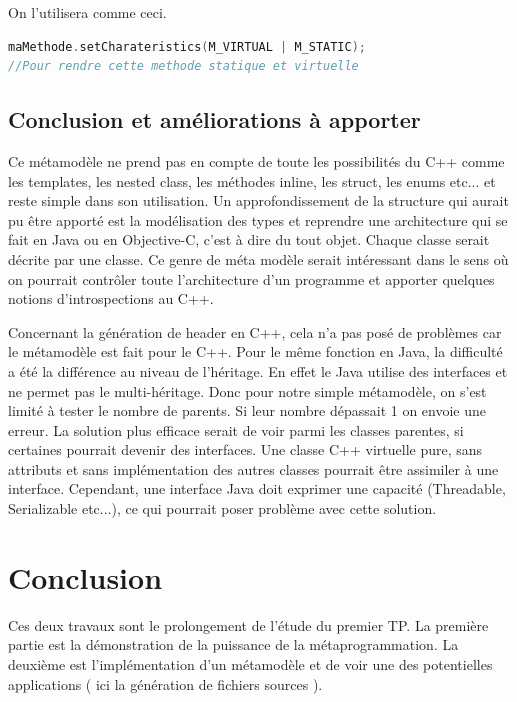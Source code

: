 \documentclass[a4paper,11pt]{report}
\begin{document}
{\normalsize{
On l'utilisera comme ceci.
}

\begin{lstlisting}[language=C++]
maMethode.setCharateristics(M_VIRTUAL | M_STATIC); 
//Pour rendre cette methode statique et virtuelle
\end{lstlisting}

\section{Conclusion et améliorations à apporter}

\normalsize{
Ce métamodèle ne prend pas en compte de toute les possibilités du C++ comme les templates, les nested class, les méthodes inline, les struct, les enums etc... et reste simple dans son utilisation. Un approfondissement de la structure qui aurait pu être apporté est la modélisation des types et reprendre une architecture qui se fait en Java ou en Objective-C, c'est à dire du tout objet. Chaque classe serait décrite par une classe. Ce genre de méta modèle serait intéressant dans le sens où on pourrait contrôler toute l'architecture d'un programme et  apporter quelques notions d'introspections au C++. 

Concernant la génération de header en C++, cela n'a pas posé de problèmes car le métamodèle est fait pour le C++. Pour le même fonction en Java, la difficulté a été la différence au niveau de l'héritage. En effet le Java utilise  des interfaces et ne permet pas le multi-héritage. Donc pour notre simple métamodèle, on s'est limité à tester le nombre de parents. Si leur nombre dépassait 1 on envoie une erreur. La solution plus efficace serait de voir parmi les classes parentes, si certaines pourrait devenir des interfaces. Une classe C++ virtuelle pure, sans attributs et sans implémentation des autres classes pourrait être assimiler à une interface. Cependant, une interface Java doit exprimer une capacité (Threadable, Serializable etc...), ce qui pourrait poser problème avec cette solution. 

\chapter{Conclusion}

\normalsize{
Ces deux travaux sont le prolongement de l'étude du premier TP. La première partie est la démonstration de la puissance de la métaprogrammation. La deuxième est l'implémentation d'un métamodèle et de voir une des potentielles applications ( ici la génération de fichiers sources ). \\
}

}}
\end{document}
